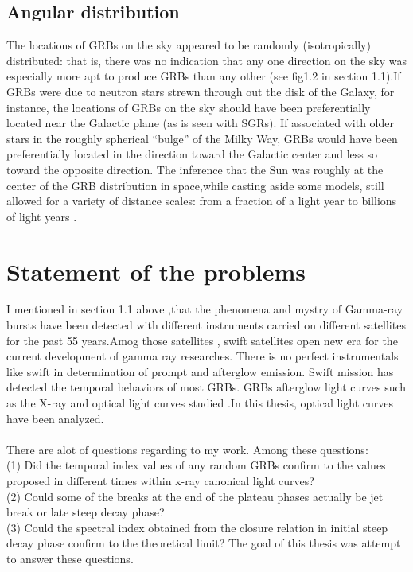 \subsection{Angular distribution}
The locations of GRBs on the sky appeared to be randomly (isotropically) distributed:
that is, there was no indication that any one direction on the sky was especially
more apt to produce GRBs than any other (see fig1.2 in section 1.1).If GRBs were
due to neutron stars strewn through out the disk of the Galaxy, for instance, the
locations of GRBs on the sky should have been preferentially located near the
Galactic plane (as is seen with SGRs). If associated with older stars in the roughly
spherical “bulge” of the Milky Way, GRBs would have been preferentially located in
the direction toward the Galactic center and less so toward the opposite direction.
The inference that the Sun was roughly at the center of the GRB distribution in
space,while casting aside some models, still allowed for a variety of distance scales: from a fraction of a light year to billions of light years \citep{7}.
\section{Statement of the problems}
I mentioned in section 1.1 above ,that the phenomena and mystry of Gamma-ray
bursts have been detected with different  instruments carried on different  satellites for the past 55 years.Amog those satellites , swift satellites open new era for the current development of gamma ray researches. There is no perfect instrumentals like swift in determination of prompt and afterglow emission. Swift mission has detected the temporal behaviors of most GRBs. GRBs afterglow light curves such as the X-ray and optical light curves studied .In this thesis, optical light curves have been analyzed.\\\\
There are alot of questions regarding to my  work. Among these questions:\\
(1) Did the temporal index values of any random GRBs confirm to the values
proposed in different times within x-ray  canonical light curves?\\
(2) Could some of the breaks at the end of the plateau phases actually be jet break
or late steep decay phase?\\
(3) Could the spectral index obtained from the closure relation in initial steep decay phase confirm to the theoretical limit? The goal of this thesis was attempt to
answer these questions.
